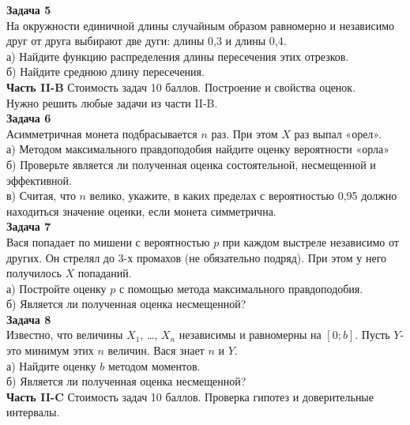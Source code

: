 \documentclass[12pt, a4paper]{article}\usepackage[]{graphicx}\usepackage[]{color}
\begin{document}
\textbf{Задача 5} \\
На окружности единичной длины случайным образом равномерно и независимо друг от друга выбирают две дуги: длины 0,3 и длины 0,4. \\
а) Найдите функцию распределения длины пересечения этих отрезков. \\
б) Найдите среднюю длину пересечения. \\



\textbf{Часть II-B} Стоимость задач 10 баллов. Построение и свойства оценок. \\

Нужно решить любые \textbf{} задачи из части II-B. \\

\textbf{Задача 6} \\
Асимметричная монета подбрасывается $n$ раз. При этом $X$ раз выпал «орел». \\
а) Методом максимального правдоподобия найдите оценку вероятности «орла» \\
б) Проверьте является ли полученная оценка состоятельной, несмещенной и эффективной.\\
в) Считая, что $n$ велико, укажите, в каких пределах с вероятностью 0,95 должно находиться значение оценки, если монета симметрична. \\


\textbf{Задача 7} \\
Вася попадает по мишени с вероятностью $p$ при каждом выстреле независимо от других. Он стрелял до 3-х промахов (не обязательно подряд). При этом у него получилось $X$ попаданий. \\
а) Постройте оценку $p$ с помощью метода максимального правдоподобия. \\
б) Является ли полученная оценка несмещенной? \\


\textbf{Задача 8} \\
Известно, что величины $X_{1}$, \ldots, $X_{n}$ независимы и равномерны на $[0;b]$. Пусть $Y$- это минимум этих $n$ величин. Вася знает $n$ и $Y$. \\
а) Найдите оценку $b$ методом моментов. \\
б) Является ли полученная оценка несмещенной? \\


\textbf{Часть II-C} Стоимость задач 10 баллов. Проверка гипотез и доверительные интервалы. \\
\end{document}
